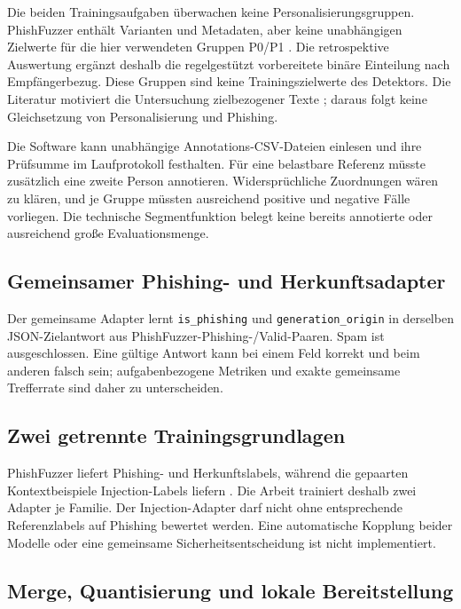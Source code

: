 \documentclass[12pt,twoside=false,a4paper,parskip]{scrbook}
\begin{document}
Die beiden Trainingsaufgaben überwachen keine Personalisierungsgruppen. PhishFuzzer enthält Varianten und Metadaten, aber keine unabhängigen Zielwerte für die hier verwendeten Gruppen P0/P1 \cite{toth2025phishfuzzer}. Die retrospektive Auswertung ergänzt deshalb die regelgestützt vorbereitete binäre Einteilung nach Empfängerbezug. Diese Gruppen sind keine Trainingszielwerte des Detektors. Die Literatur motiviert die Untersuchung zielbezogener Texte \cite{hazell2023spear,pajola2025ephishgen}; daraus folgt keine Gleichsetzung von Personalisierung und Phishing.

Die Software kann unabhängige Annotations-CSV-Dateien einlesen und ihre Prüfsumme im Laufprotokoll festhalten. Für eine belastbare Referenz müsste zusätzlich eine zweite Person annotieren. Widersprüchliche Zuordnungen wären zu klären, und je Gruppe müssten ausreichend positive und negative Fälle vorliegen. Die technische Segmentfunktion belegt keine bereits annotierte oder ausreichend große Evaluationsmenge.

\subsection{Gemeinsamer Phishing- und Herkunftsadapter}\label{sec:joint-adapter}

Der gemeinsame Adapter lernt \texttt{is\_phishing} und \texttt{generation\_origin} in derselben JSON-Zielantwort aus PhishFuzzer-Phishing-/Valid-Paaren. Spam ist ausgeschlossen. Eine gültige Antwort kann bei einem Feld korrekt und beim anderen falsch sein; aufgabenbezogene Metriken und exakte gemeinsame Trefferrate sind daher zu unterscheiden.

\subsection{Zwei getrennte Trainingsgrundlagen}\label{sec:zwei-adapter-herausforderung}

PhishFuzzer liefert Phishing- und Herkunftslabels, während die gepaarten Kontextbeispiele Injection-Labels liefern \cite{toth2025phishfuzzer,abdelnabi2026agents}. Die Arbeit trainiert deshalb zwei Adapter je Familie. Der Injection-Adapter darf nicht ohne entsprechende Referenzlabels auf Phishing bewertet werden. Eine automatische Kopplung beider Modelle oder eine gemeinsame Sicherheitsentscheidung ist nicht implementiert.

\subsection{Merge, Quantisierung und lokale Bereitstellung}
\end{document}
